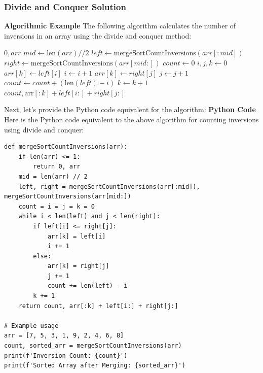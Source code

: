 \documentclass[12pt]{book} %
\begin{document}
\subsubsection{Divide and Conquer Solution}
\textbf{Algorithmic Example}
\FloatBarrier
The following algorithm calculates the number of inversions in an array using the divide and conquer method:
\FloatBarrier
\begin{algorithm}
\caption{Count Inversions with Divide and Conquer}
\begin{algorithmic}[1]
        \State \Return $0, arr$
    \EndIf
    \State $mid \gets \text{len}(arr) // 2$
    \State $left \gets \text{mergeSortCountInversions}(arr[:mid])$
    \State $right \gets \text{mergeSortCountInversions}(arr[mid:])$
    \State $count \gets 0$
    \State $i, j, k \gets 0$
            \State $arr[k] \gets left[i]$
            \State $i \gets i + 1$
        \Else
            \State $arr[k] \gets right[j]$
            \State $j \gets j + 1$
            \State $count \gets count + (\text{len}(left) - i)$
        \EndIf
        \State $k \gets k + 1$
    \EndWhile
    \State \Return $count, \text{arr}[:k] + left[i:] + right[j:]$
\EndFunction
\end{algorithmic}
\end{algorithm}
\FloatBarrier
Next, let's provide the Python code equivalent for the algorithm:
\FloatBarrier
\textbf{Python Code}
\FloatBarrier
Here is the Python code equivalent to the above algorithm for counting inversions using divide and conquer:
\FloatBarrier
\begin{lstlisting}
def mergeSortCountInversions(arr):
    if len(arr) <= 1:
        return 0, arr
    mid = len(arr) // 2
    left, right = mergeSortCountInversions(arr[:mid]), mergeSortCountInversions(arr[mid:])
    count = i = j = k = 0
    while i < len(left) and j < len(right):
        if left[i] <= right[j]:
            arr[k] = left[i]
            i += 1
        else:
            arr[k] = right[j]
            j += 1
            count += len(left) - i
        k += 1
    return count, arr[:k] + left[i:] + right[j:]

# Example usage
arr = [7, 5, 3, 1, 9, 2, 4, 6, 8]
count, sorted_arr = mergeSortCountInversions(arr)
print(f'Inversion Count: {count}')
print(f'Sorted Array after Merging: {sorted_arr}')
\end{lstlisting}
\end{document}
